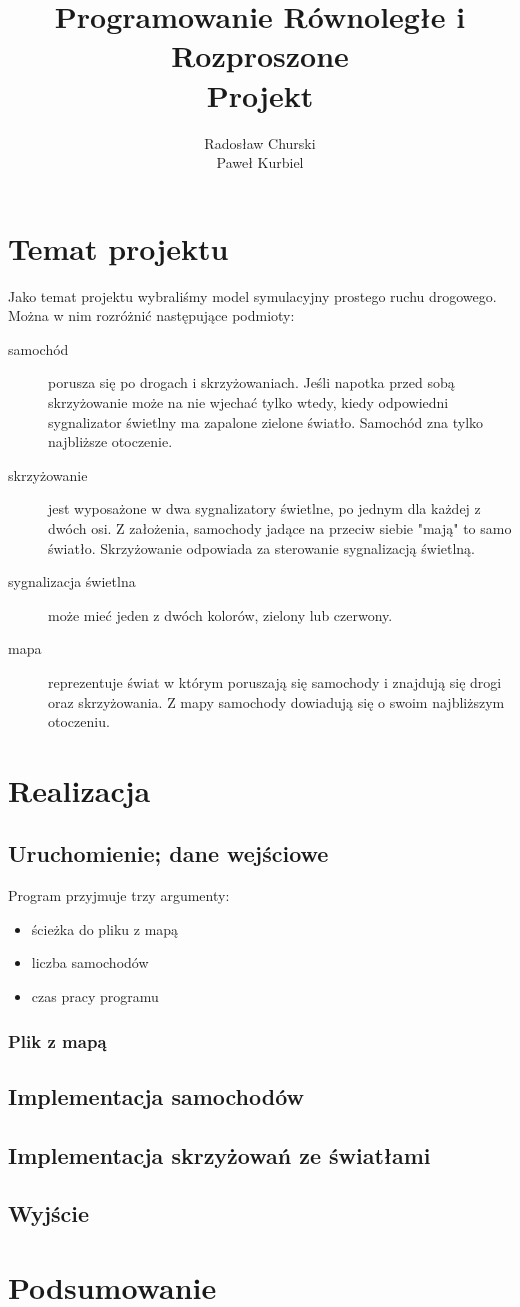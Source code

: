 \documentclass[a4paper]{article}
\title{Programowanie Równoległe i Rozproszone\\Projekt}
\author{Radosław Churski \\ Paweł Kurbiel}
\begin{document}
\begin{titlepage}
\maketitle
\end{titlepage}
\tableofcontents
\section{Temat projektu}
Jako temat projektu wybraliśmy model symulacyjny prostego ruchu drogowego. Można w nim rozróżnić następujące podmioty:
\begin{description}
\item[samochód] porusza się po drogach i skrzyżowaniach. Jeśli napotka przed sobą skrzyżowanie może na nie wjechać tylko wtedy, kiedy odpowiedni sygnalizator świetlny ma zapalone zielone światło. Samochód zna tylko najbliższe otoczenie.
\item[skrzyżowanie] jest wyposażone w dwa sygnalizatory świetlne, po jednym dla każdej z dwóch osi. Z założenia, samochody jadące na przeciw siebie "mają" to samo światło. Skrzyżowanie odpowiada za sterowanie sygnalizacją świetlną.
\item[sygnalizacja świetlna] może mieć jeden z dwóch kolorów, zielony lub czerwony.
\item[mapa] reprezentuje świat w którym poruszają się samochody i znajdują się drogi oraz skrzyżowania. Z mapy samochody dowiadują się o swoim najbliższym otoczeniu.
\end{description}
\section{Realizacja}
\subsection{Uruchomienie; dane wejściowe}
Program przyjmuje trzy argumenty:
\begin{itemize}
\item ścieżka do pliku z mapą
\item liczba samochodów
\item czas pracy programu
\end{itemize}
\subsubsection{Plik z mapą}
\subsection{Implementacja samochodów}
\subsection{Implementacja skrzyżowań ze światłami}
\subsection{Wyjście}
\section{Podsumowanie}
\end{document}
